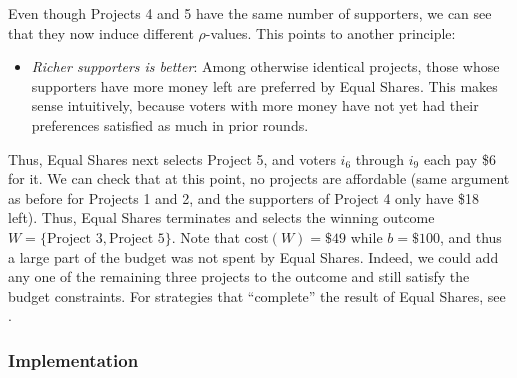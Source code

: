 \documentclass[10pt]{scrartcl}
\newcommand{\cost}{{{\mathrm{cost}}}}
\theoremstyle{definition}
\theoremstyle{plain}
\begin{document}
Even though Projects 4 and 5 have the same number of supporters, we can see that they now induce different $\rho$-values. This points to another principle:
\begin{itemize}
	\item \emph{Richer supporters is better}: Among otherwise identical projects, those whose supporters have more money left are preferred by Equal Shares. This makes sense intuitively, because voters with more money have not yet had their preferences satisfied as much in prior rounds.
\end{itemize}
Thus, Equal Shares next selects Project 5, and voters $i_6$ through $i_9$ each pay \$6 for it. We can check that at this point, no projects are affordable (same argument as before for Projects 1 and 2, and the supporters of Project 4 only have \$18 left). Thus, Equal Shares terminates and selects the winning outcome $W = \{\text{Project 3}, \text{Project 5}\}$. Note that $\cost(W) = \$49$ while $b = \$100$, and thus a large part of the budget was not spent by Equal Shares. Indeed, we could add any one of the remaining three projects to the outcome and still satisfy the budget constraints. For strategies that ``complete'' the result of Equal Shares, see .

\subsubsection*{Implementation}
\newcommand{\money}{\ensuremath{b}}
\end{document}

